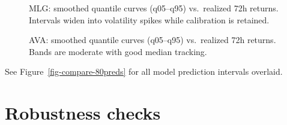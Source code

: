 \documentclass[
  a4paper,
  DIV=11,
  numbers=noendperiod]{scrreprt}
\begin{document}
\begin{figure}


\caption{\label{fig-fan-mlg}MLG: smoothed quantile curves (q05--q95)
vs.~realized 72h returns. Intervals widen into volatility spikes while
calibration is retained.}

\end{figure}%

\begin{figure}


\caption{\label{fig-fan-ava}AVA: smoothed quantile curves (q05--q95)
vs.~realized 72h returns. Bands are moderate with good median tracking.}

\end{figure}%

See Figure~\ref{fig-compare-80preds} for all model prediction intervals
overlaid.

\section{Robustness checks}\label{robustness-checks}
\end{document}

